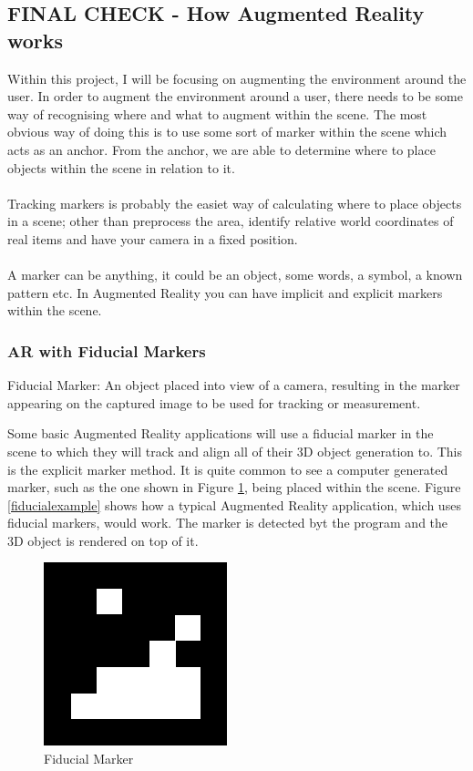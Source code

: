 \documentclass[11pt]{article}
\begin{document}
\subsection{FINAL CHECK - How Augmented Reality works}
Within this project, I will be focusing on augmenting the environment around
the user. 
In order to augment the environment around a user, there needs to be some
way of recognising where and what to augment within the scene. The most
obvious way of doing this is to use some sort of marker within the scene
which acts as an anchor. From the anchor, we are able to determine
where to place objects within the scene in relation to it. \\
\\
Tracking markers is probably the easiet way of calculating 
where to place objects in a scene; other than preprocess the area, identify
relative world coordinates of real items and have your camera in a fixed
position. \\
\\
A marker can be anything, it could be an object, some words, a symbol, a
known pattern etc. In Augmented Reality you can have implicit and explicit 
markers within the scene. 

\subsubsection{AR with Fiducial Markers}
\begin{center}
	Fiducial Marker: An object placed into view of a camera, resulting in
	the marker appearing on the captured image to be used for tracking
	or measurement.
\end{center}

Some basic Augmented Reality applications will use a fiducial marker in
the scene to which they will track and align all of their 3D object 
generation to. This is the explicit marker method. It is quite common 
to see a computer generated marker, such as the one shown in 
Figure \ref{fiducial}, being placed within the scene. Figure
\ref{fiducialexample} shows how a typical Augmented Reality application,
which uses fiducial markers, would work. The marker is detected
byt the program and the 3D object is rendered on top of it.\\

\begin{figure}[!h]
	\centering
	\includegraphics[scale=0.8]{pics/fiducial.png}
	\caption{Fiducial Marker}
	\label{fiducial}
\end{figure}
\end{document}
